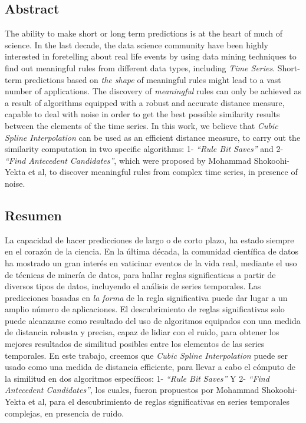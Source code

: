 \subsection*{\textbf{Abstract}}
The ability to make short or long term predictions is at the heart of much of science. In the last decade, the data science community have been highly interested in foretelling about real life events by using data mining techniques to find out meaningful rules from different data types, including \textit{Time Series}. Short-term predictions based on \textit{the shape} of meaningful rules might lead to a vast number of applications. The discovery of \textit{meaningful} rules can only be achieved as a result of algorithms equipped with a robust and accurate distance measure, capable to deal with noise in order to get the best possible similarity results between the elements of the time series. In this work, we believe that \textit{Cubic Spline Interpolation} can be used as an efficient distance measure, to carry out the similarity computation in two specific algorithms: 1- \textit{\enquote{Rule Bit Saves}} and 2- \textit{\enquote{Find Antecedent Candidates}}, which were proposed by Mohammad Shokoohi-Yekta et al, to discover meaningful rules from complex time series, in presence of noise.\par
\subsection*{\textbf{Resumen}}
La capacidad de hacer predicciones de largo o de corto plazo, ha estado siempre en el coraz\'on de la ciencia. En la \'ultima d\'ecada, la comunidad cient\'ifica de datos ha mostrado un gran inter\'es en vaticinar eventos de la vida real, mediante el uso de t\'ecnicas de miner\'ia de datos, para hallar reglas significaticas a partir de diversos tipos de datos, incluyendo el an\'alisis de series temporales. Las predicciones basadas en \textit{la forma} de la regla significativa puede dar lugar a un amplio n\'umero de aplicaciones. El descubrimiento de reglas significativas solo puede alcanzarse como resultado del uso de algoritmos equipados con una medida de distancia robusta y precisa, capaz de lidiar con el ruido, para obtener los mejores resultados de similitud posibles entre los elementos de las series temporales. En este trabajo, creemos que \textit{Cubic Spline Interpolation} puede ser usado como una medida de distancia efficiente, para llevar a cabo el c\'omputo de la similitud en dos algoritmos espec\'ificos: 1- \textit{\enquote{Rule Bit Saves}} Y 2- \textit{\enquote{Find Antecedent Candidates}}, los cuales, fueron propuestos por Mohammad Shokoohi-Yekta et al, para el descubrimiento de reglas significativas en series temporales complejas, en presencia de ruido.